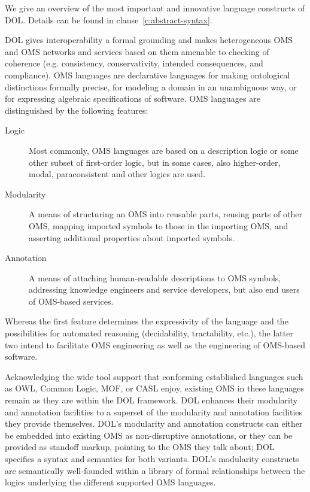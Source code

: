 \documentclass[10pt,%
\ifpretendfinal
final%
\else
draft%
\fi,
]{scrreprt}
\makeatletter
\newcommand*\CommentAuthor{}
\renewcommand*\CommentAuthor{#1}}
\newcommand*\CommentDate{}
\renewcommand*\CommentDate{#1}}
\newcommand*\CommentId{}
\renewcommand*\CommentId{#1}}
\newcommand*\CommentType{}
\renewcommand*\CommentType{#1}}
\newcommand*{\SetCommentColorByType}[1]{%
\edef\localType{{#1}}%
\expandafter\ifstrequal\localType{q-aut}{\colorlet{CommentColor}{red}}{%
\expandafter\ifstrequal\localType{q-all}{\colorlet{CommentColor}{orange}}{%
\expandafter\ifstrequal\localType{todo}{\colorlet{CommentColor}{orange}}{%
\expandafter\ifstrequal\localType{fyi}{\colorlet{CommentColor}{lightgray}}{%
\colorlet{CommentColor}{yellow}}}}}}
\newcommand*{\SetCommentPrefixByType}[1]{%
\edef\localType{{#1}}%
\expandafter\@ifmtarg\localType{%
\edef\CommentPrefix{}%
}{%
\caseupper[q]{#1}%
\edef\CommentPrefix{\thestring: }%
}}
\newcommand*{\initComment}[1]{%
\setkeys{Comment}{#1}%
\SetCommentColorByType{\CommentType}%
\relax%
\SetCommentPrefixByType{\CommentType}%
\relax%
}
\newcommand*{\todonote}[2][]{%
\initComment{#1}%
\pdfcomment[author=\CommentAuthor,color=CommentColor,date=\CommentDate,id=\CommentId]{%
\CommentPrefix
#2}}
\renewcommand*{\todonote}[2][]{%
\initComment{#1}%
\ednote{\CommentPrefix #2}}
\makeatother
\begin{document}
%
%
\label{c:design:overview}
%
We give an overview of the most important and innovative language
constructs of DOL. Details can be found in clause~\ref{c:abstract-syntax}.


DOL gives interoperability a formal grounding and makes heterogeneous OMS and OMS networks and services based on them amenable to checking of coherence (e.g. consistency, conservativity, intended consequences, and compliance). OMS languages are declarative languages for making ontological distinctions formally precise, for modeling a domain in an unambiguous way, or for expressing algebraic specifications of software.   OMS languages are distinguished by the following features:

\begin{description}
\item[Logic] Most commonly, OMS languages are based on a description logic or some other subset of first-order logic, but in some cases, also higher-order, modal, paraconsistent and other logics are used.
\item[Modularity] A means of structuring an OMS into reusable parts, reusing parts of other OMS, mapping imported symbols to those in the importing OMS, and asserting additional properties about imported symbols.
\item[Annotation] A means of attaching human-readable descriptions to OMS symbols, addressing knowledge engineers and service developers, but also end users of OMS-based services.
\end{description}
Whereas the first feature determines the expressivity of the language and the possibilities for automated reasoning (decidability, tractability, etc.), the latter two intend to facilitate OMS engineering as well as the engineering of OMS-based software.

Acknowledging the wide tool support that conforming established languages such as OWL, Common Logic, MOF, or CASL enjoy, existing OMS in these languages remain as they are within the DOL framework. DOL enhances their modularity and annotation facilities to a superset of the modularity and annotation facilities they provide themselves. DOL's modularity and annotation constructs can either be embedded into existing OMS as non-disruptive annotations, or they can be provided as standoff markup, pointing to the OMS they talk about; DOL specifies a syntax and semantics for both variants. DOL's modularity constructs are semantically well-founded within a library of formal relationships between the logics underlying the different supported OMS languages.
\end{document}
